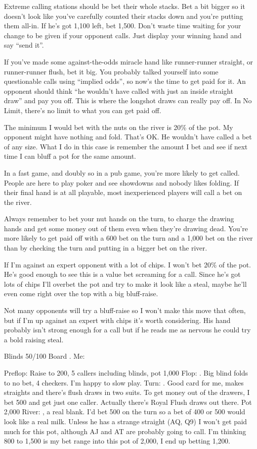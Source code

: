 Extreme calling stations should be bet their whole stacks. Bet a bit bigger
so it doesn't look like you've carefully counted their stacks down and you're
putting them all-in. If he's got 1,100 left, bet 1,500. Don't waste time
waiting for your change to be given if your opponent calls. Just display
your winning hand and say ``send it''.

If you've made some against-the-odds miracle hand like runner-runner
straight, or runner-runner flush, bet it big. You probably talked
yourself into some questionable calls using ``implied odds'', so now's
the time to get paid for it. An opponent should think ``he wouldn't
have called with just an inside straight draw'' and pay you off. This
is where the longshot draws can really pay off. In No Limit, there's
no limit to what you can get paid off.

The minimum I would bet with the nuts on the river is 20\% of the pot.
My opponent might have nothing and fold. That's OK. He wouldn't have
called a bet of any size. What I do in this case is remember the amount
I bet and see if next time I can bluff a pot for the same amount.

In a fast game, and doubly so in a pub game, you're more likely
to get called. People are here to play poker and see showdowns and
nobody likes folding. If their final hand is at all playable, most
inexperienced players will call a bet on the river.

Always remember to bet your nut hands on the turn, to charge
the drawing hands and get some money out of them even when they're
drawing dead. You're more likely to get paid off with a 600 bet on the
turn and a 1,000 bet on the river than by checking the turn and putting
in a bigger bet on the river.

If I'm against an expert opponent with a lot of chips. I won't bet
20\% of the pot. He's good enough to see this is a value bet screaming
for a call. Since he's got lots of chips I'll overbet the pot and try
to make it look like a steal, maybe he'll even come right over the top
with a big bluff-raise.

Not many opponents will try a bluff-raise so I won't make this move
that often, but if I'm up against an expert with chips it's worth
considering. His hand probably isn't strong enough for a call but if he
reads me as nervous he could try a bold raising steal.

Blinds 50/100 Board \Kd\Kh\Jd\tenh\tres. Me: \Kc\Jc

Preflop: Raise to 200, 5 callers including blinds, pot 1,000
Flop: \Kd\Kh\Jd. Big blind folds to no bet, 4 checkers. I'm happy to slow play.
Turn: \tenh. Good card for me, makes straights and there's flush draws in two
      suits. To get money out of the drawers, I bet 500 and get just one caller.
      Actually there's Royal Flush draws out there. Pot 2,000
River: \tres, a real blank. I'd bet 500 on the turn so a bet of 400 or 500 would
      look like a real milk. Unless he has a strange straight (AQ, Q9) I
      won't get paid much for this pot, although AJ and AT are probably going
      to call. I'm thinking 800 to 1,500 is my bet range into this pot of 2,000,
      I end up betting 1,200.


